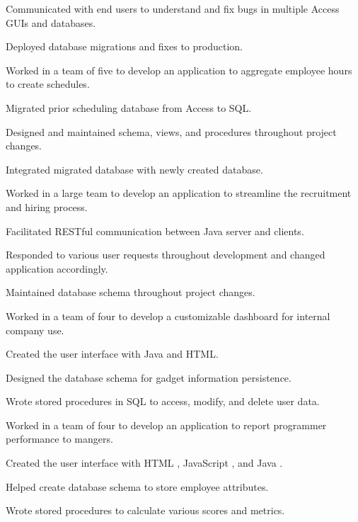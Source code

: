 \documentclass{playground}
\begin{document}
						\item Communicated with end users to understand and fix bugs in multiple Access GUIs and databases.
						\item Deployed database migrations and fixes to production.
					\resumesublistend
			\item {}
					\resumesublistbegin
						\item Worked in a team of five to develop an application to aggregate employee hours to create schedules.
						\item Migrated prior scheduling database from Access to SQL.
						\item Designed and maintained schema, views, and procedures throughout project changes.
						\item Integrated migrated database with newly created database.
					\resumesublistend
			\item {}
					\resumesublistbegin
						\item Worked in a large team to develop an application to streamline the recruitment and hiring process.
						\item Facilitated RESTful communication between Java server and clients.
						\item Responded to various user requests throughout development and changed application accordingly.
						\item Maintained database schema throughout project changes.
					\resumesublistend
			\item {}
					\resumesublistbegin
						\item Worked in a team of four to develop a customizable dashboard for internal company use.
						\item Created the user interface with Java and HTML.
						\item Designed the database schema for gadget information persistence.
						\item Wrote stored procedures in SQL to access, modify, and delete user data.
					\resumesublistend
			\item {}
					\resumesublistbegin
						\item Worked in a team of four to develop an application to report programmer performance to mangers.
						\item Created the user interface with HTML , JavaScript , and Java .
						\item Helped create database schema to store employee attributes.
						\item Wrote stored procedures to calculate various scores and metrics.
					\resumesublistend
			\resumesublistend
\end{document}

